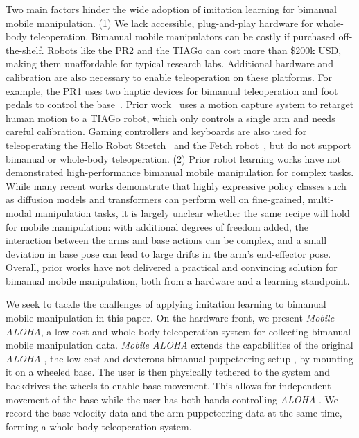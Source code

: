 \documentclass[11pt, a4paper, logo, twocolumn]{stanford}
\newcommand{\method}{\textit{Mobile ALOHA} }
\newcommand{\methodcomma}{\textit{Mobile ALOHA}}
\newcommand{\aloha}{\textit{ALOHA} }
\begin{document}
Two main factors hinder the wide adoption of imitation learning for bimanual mobile manipulation.
(1) We lack
accessible, plug-and-play hardware for whole-body teleoperation. Bimanual mobile manipulators can be costly if purchased off-the-shelf. Robots like the PR2 and the TIAGo can cost more than \$200k USD, making them unaffordable for typical research labs.
Additional hardware and calibration are also necessary to enable teleoperation on these platforms. For example, the PR1 uses two haptic devices for bimanual teleoperation and foot pedals to control the base~\cite{wyrobek2008towards}. Prior work~\cite{arduengo2021human} uses a motion capture system to retarget human motion to a TIAGo robot, which only controls a single arm and needs careful calibration. Gaming controllers and keyboards are also used for teleoperating the Hello Robot Stretch~\cite{stretch} and the Fetch robot~\cite{fetch}, but do not support bimanual or whole-body teleoperation.
(2) Prior robot learning works have not demonstrated high-performance bimanual mobile manipulation for complex tasks.
While many recent works demonstrate that highly expressive policy classes such as diffusion models and transformers can perform well on fine-grained, multi-modal manipulation tasks,
it is largely unclear whether the same recipe will hold for mobile manipulation: with additional degrees of freedom added, the interaction between the arms and base actions can be complex, and a small deviation in base pose can lead to large drifts in the arm's end-effector pose. 
Overall, prior works have not delivered a practical and convincing solution for bimanual mobile manipulation, both from a hardware and a learning standpoint.


We seek to tackle the challenges of applying imitation learning to bimanual mobile manipulation in this paper. On the hardware front, we present \methodcomma, a low-cost and whole-body teleoperation system for collecting bimanual mobile manipulation data. 
\method extends the capabilities of the original \aloha, the low-cost and dexterous bimanual puppeteering setup \cite{zhao2023learning}, by mounting it on a wheeled base.
The user is then physically tethered to the system and backdrives the wheels to enable base movement.
This allows for independent movement of the base while the user has both hands controlling \aloha. 
We record the base velocity data and the arm puppeteering data at the same time, forming a whole-body teleoperation system. 
\end{document}
